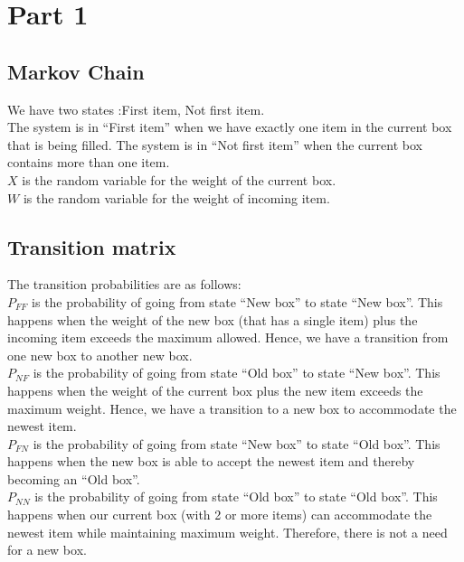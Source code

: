 \documentclass[10pt,a4paper]{article}
\begin{document}
\section{Part 1}
\subsection*{Markov Chain}
We have two states :{First item, Not first item}. \\
The system is in ``First item'' when we have exactly one item in the current box that is being filled. The system is in ``Not first item'' when the current box contains more than one item.\\
$ X $ is the random variable for the weight of the current box.\\
$ W $ is the random variable for the weight of incoming item.\\

\subsection*{Transition matrix}
The transition probabilities are as follows:\\
$ P_{FF} $ is the probability of going from state ``New box'' to state ``New box''. This happens when the weight of the new box (that has a single item) plus the incoming item exceeds the maximum allowed. Hence, we have a transition from one new box to another new box.\\
$ P_{NF} $ is the probability of going from state ``Old box'' to state ``New box''. This happens when the weight of the current box plus the new item exceeds the maximum weight. Hence, we have a transition to a new box to accommodate the newest item.\\
$ P_{FN} $ is the probability of going from state ``New box'' to state ``Old box''. This happens when the new box is able to accept the newest item and thereby becoming an ``Old box''.\\
$ P_{NN} $ is the probability of going from state ``Old box'' to state ``Old box''. This happens when our current box (with 2 or more items) can accommodate the newest item while maintaining maximum weight. Therefore, there is not a need for a new box. \\
\end{document}
